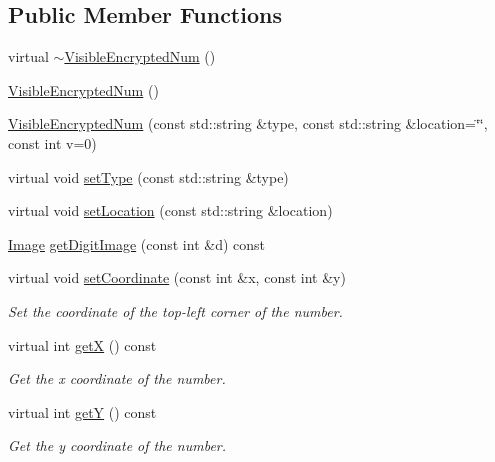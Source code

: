 \subsection*{Public Member Functions}
\begin{DoxyCompactItemize}
\item 
virtual \mbox{\hyperlink{class_visible_encrypted_num_abab6f8eac59edf419a06bfeda2ba2540}{$\sim$\+Visible\+Encrypted\+Num}} ()
\item 
\mbox{\hyperlink{class_visible_encrypted_num_a7a9d1fff65748c1fdae31d06013a74e4}{Visible\+Encrypted\+Num}} ()
\item 
\mbox{\hyperlink{class_visible_encrypted_num_ab2e78be9742797eb41e9e80d0e6d594f}{Visible\+Encrypted\+Num}} (const std\+::string \&type, const std\+::string \&location=\char`\"{}\char`\"{}, const int v=0)
\item 
virtual void \mbox{\hyperlink{class_visible_encrypted_num_abca1e8c379a3eba175937c7152ba298e}{set\+Type}} (const std\+::string \&type)
\item 
virtual void \mbox{\hyperlink{class_visible_encrypted_num_a67e9d05edbbb67a3881123e99523f9c1}{set\+Location}} (const std\+::string \&location)
\item 
\mbox{\hyperlink{class_image}{Image}} \mbox{\hyperlink{class_visible_encrypted_num_a9468a2524953e029285d7668b09a45bb}{get\+Digit\+Image}} (const int \&d) const
\item 
virtual void \mbox{\hyperlink{class_visible_encrypted_num_a79b010bfd2b90f1c0398a4ccfed80912}{set\+Coordinate}} (const int \&x, const int \&y)
\begin{DoxyCompactList}\small\item\em Set the coordinate of the top-\/left corner of the number. \end{DoxyCompactList}\item 
virtual int \mbox{\hyperlink{class_visible_encrypted_num_a86bf5a8a6fe1532c3575c4cc7f1e20a0}{getX}} () const
\begin{DoxyCompactList}\small\item\em Get the x coordinate of the number. \end{DoxyCompactList}\item 
virtual int \mbox{\hyperlink{class_visible_encrypted_num_a9ee9f0f402141ca4d4692b8470a76ba0}{getY}} () const
\begin{DoxyCompactList}\small\item\em Get the y coordinate of the number. \end{DoxyCompactList}\item 

\end{DoxyCompactItemize}
